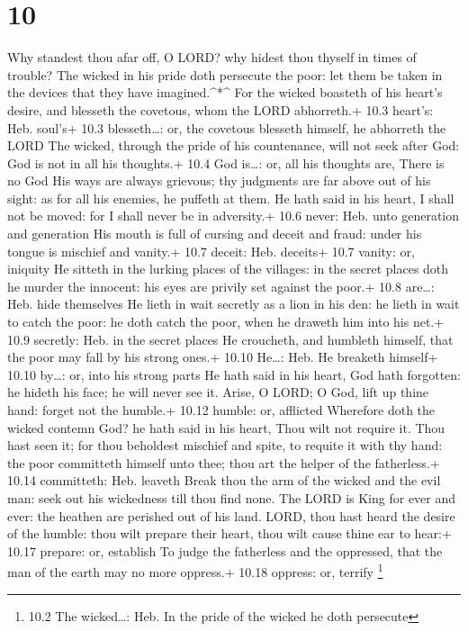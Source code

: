 \hypertarget{section-9}{%
\section{10}\label{section-9}}

 Why standest thou afar off, O LORD? why hidest thou thyself
in times of trouble?  The wicked in his pride doth persecute
the poor: let them be taken in the devices that they have
imagined.\^{}*\^{}  For the wicked boasteth of his heart's
desire, and blesseth the covetous, whom the LORD abhorreth.+ 10.3
heart's: Heb. soul's+ 10.3 blesseth\ldots: or, the covetous blesseth
himself, he abhorreth the LORD  The wicked, through the
pride of his countenance, will not seek after God: God is not in all his
thoughts.+ 10.4 God is\ldots: or, all his thoughts are, There is no God
 His ways are always grievous; thy judgments are far above
out of his sight: as for all his enemies, he puffeth at them.
 He hath said in his heart, I shall not be moved: for I
shall never be in adversity.+ 10.6 never: Heb. unto generation and
generation  His mouth is full of cursing and deceit and
fraud: under his tongue is mischief and vanity.+ 10.7 deceit: Heb.
deceits+ 10.7 vanity: or, iniquity  He sitteth in the
lurking places of the villages: in the secret places doth he murder the
innocent: his eyes are privily set against the poor.+ 10.8 are\ldots:
Heb. hide themselves  He lieth in wait secretly as a lion in
his den: he lieth in wait to catch the poor: he doth catch the poor,
when he draweth him into his net.+ 10.9 secretly: Heb. in the secret
places  He croucheth, and humbleth himself, that the poor
may fall by his strong ones.+ 10.10 He\ldots: Heb. He breaketh himself+
10.10 by\ldots: or, into his strong parts  He hath said in
his heart, God hath forgotten: he hideth his face; he will never see it.
 Arise, O LORD; O God, lift up thine hand: forget not the
humble.+ 10.12 humble: or, afflicted  Wherefore doth the
wicked contemn God? he hath said in his heart, Thou wilt not require it.
 Thou hast seen it; for thou beholdest mischief and spite,
to requite it with thy hand: the poor committeth himself unto thee; thou
art the helper of the fatherless.+ 10.14 committeth: Heb. leaveth
 Break thou the arm of the wicked and the evil man: seek
out his wickedness till thou find none.  The LORD is King
for ever and ever: the heathen are perished out of his land.
 LORD, thou hast heard the desire of the humble: thou wilt
prepare their heart, thou wilt cause thine ear to hear:+ 10.17 prepare:
or, establish  To judge the fatherless and the oppressed,
that the man of the earth may no more oppress.+ 10.18 oppress: or,
terrify \footnote{10.2 The wicked\ldots: Heb. In the pride of the wicked
  he doth persecute}

